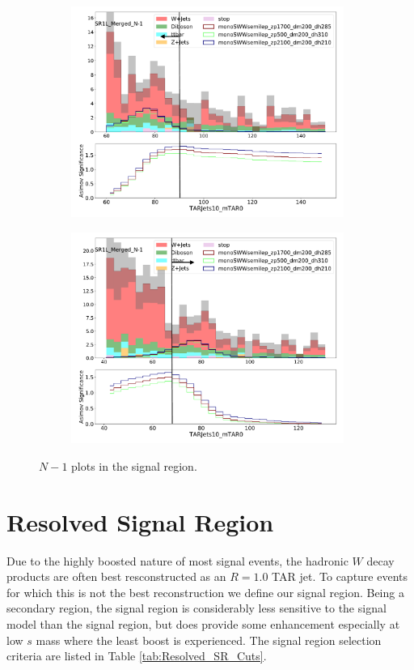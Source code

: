 \begin{figure}[htbp]
\begin{subfigure}{0.49\textwidth}
     \includegraphics[width = 0.98\textwidth]{Figures/4/N1m/TARJets10_mTAR0.pdf}
     \caption{\mTAR}
     \end{subfigure}
     \begin{subfigure}{0.49\textwidth}
     \includegraphics[width = 0.98\textwidth]{Figures/4/N1m/TARJets10_mTAR02.pdf}
     \caption{\mTAR}
     \end{subfigure}

     \caption{$N-1$ plots in the \merged signal region.}
     \label{fig:SRN1}
  \end{figure}
\FloatBarrier

\section{Resolved Signal Region}
Due to the highly boosted nature of most signal events, the hadronic $W$ decay products are often best resconstructed as an $R=1.0$ TAR jet. To capture events for which this is not the best reconstruction we define our \resolved signal region. Being a secondary region, the \resolved signal region is considerably less sensitive to the signal model than the \merged signal region, but does provide some enhancement especially at low $s$ mass where the least boost is experienced. The \resolved signal region selection criteria are listed in Table \ref{tab:Resolved_SR_Cuts}.

